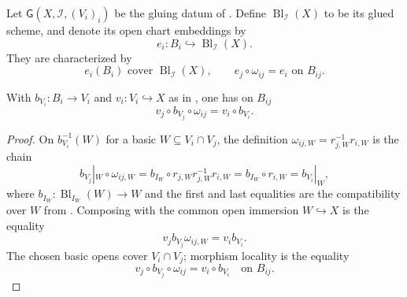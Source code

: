 \begin{definition}
  \label{def:nagata-global-blowup}

  Let $\mathsf G(X,\mathcal I,(V_i)_i)$ be the gluing datum of
  .  Define
  $\operatorname{Bl}_{\mathcal I}(X)$ to be its glued scheme, and denote its
  open chart embeddings by
  \[
    e_i\colon B_i\hookrightarrow\operatorname{Bl}_{\mathcal I}(X).
  \]
  They are characterized by
  \[
    e_i(B_i)\text{ cover }\operatorname{Bl}_{\mathcal I}(X),
    \qquad
    e_j\circ\omega_{ij}=e_i\text{ on }B_{ij}.
  \]
\end{definition}

\begin{lemma}
  \label{lemma:nagata-global-blowup-local-maps-agree}

  With $b_{V_i}\colon B_i\to V_i$ and
  $v_i\colon V_i\hookrightarrow X$ as in
  , one has on $B_{ij}$
  \[
    v_j\circ b_{V_j}\circ\omega_{ij}=v_i\circ b_{V_i}.
  \]
\end{lemma}

\begin{proof}
  On $b_{V_i}^{-1}(W)$ for a basic
  $W\subseteq V_i\cap V_j$, the definition
  $\omega_{ij,W}=r_{j,W}^{-1}r_{i,W}$ is the chain
  \[
    b_{V_j}|_W\circ\omega_{ij,W}
      =b_{I_W}\circ r_{j,W}r_{j,W}^{-1}r_{i,W}
      =b_{I_W}\circ r_{i,W}
      =b_{V_i}|_W,
  \]
  where $b_{I_W}\colon\operatorname{Bl}_{I_W}(W)\to W$ and the first and
  last equalities are the compatibility over $W$ from
  .  Composing with the common open
  immersion $W\hookrightarrow X$ is the equality
  \[
    v_jb_{V_j}\omega_{ij,W}=v_ib_{V_i}.
  \]
  The chosen basic opens cover $V_i\cap V_j$; morphism locality is the
  equality
  \[
    v_j\circ b_{V_j}\circ\omega_{ij}=v_i\circ b_{V_i}
      \quad\text{on }B_{ij}.
  \]
\end{proof}

